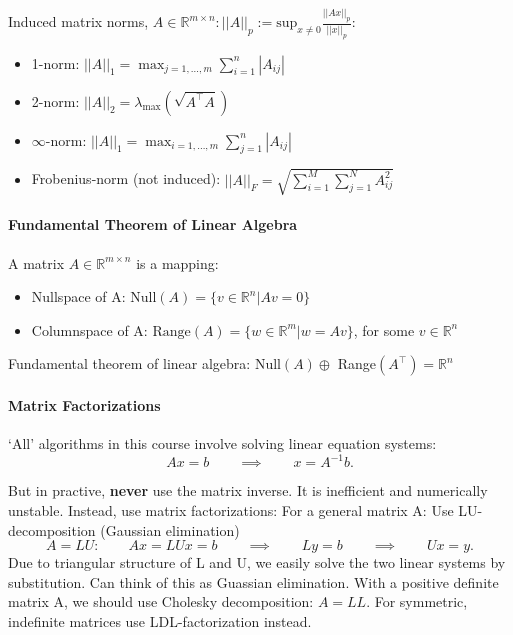 \documentclass{article}
\begin{document}
\medskip Induced matrix norms, $A \in\mathbb{R}^{m \times n}: ||A||_p := \text{sup}_{x \neq 0} \frac{||Ax||_p}{||x||_p}$:
\begin{itemize}
  \item 1-norm: $||A||_1 = \max_{j=1,\dots,m}\sum_{i=1}^{n}|A_{ij}|$
  \item 2-norm: $||A||_2 = \lambda_{\max}(\sqrt{A^{\top}A})$
  \item $\infty$-norm: $||A||_1 = \max_{i=1,\dots,m}\sum_{j=1}^{n}|A_{ij}|$
  \item Frobenius-norm (not induced): $||A||_F = \sqrt{\sum_{i=1}^{M}\sum_{j=1}^{N} A_{ij}^2}$
\end{itemize}

\paragraph{Fundamental Theorem of Linear Algebra} A matrix $A \in \mathbb{R}^{m\times n}$ is a mapping:

\medskip
{}

\begin{itemize}
  \item Nullspace of A: $\text{Null}(A) = \{v\in\mathbb{R}^{n} | Av = 0\}$
  \item Columnspace of A: $\text{Range}(A) = \{w\in \mathbb{R}^{m} | w = Av\}$, for some $v\in\mathbb{R}^{n}$
\end{itemize}

Fundamental theorem of linear algebra: Null$(A) \oplus$ Range$(A^{\top}) = \mathbb{R}^{n}$

\paragraph{Matrix Factorizations} `All' algorithms in this course involve solving linear equation systems:
\[
  Ax = b \qquad \implies \qquad x = A^{-1}b
  .\]

But in practive, \textbf{never} use the matrix inverse. It is inefficient and numerically unstable. Instead, use matrix factorizations:
For a general matrix A: Use LU-decomposition (Gaussian elimination)
\[
  A = LU : \qquad Ax = LUx = b \qquad \implies \qquad Ly = b \qquad \implies \qquad Ux = y
  .\]
Due to triangular structure of L and U, we easily solve the two linear systems by substitution. Can think of this as
Guassian elimination. With a positive definite matrix A, we should use Cholesky decomposition: $A = L L$. For symmetric, indefinite matrices
use LDL-factorization instead.
\end{document}
